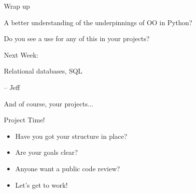\documentclass{beamer}
\begin{document}


\begin{frame}[fragile]{Wrap up}

\vfill
{\Large A better understanding of the underpinnings of OO in Python?}

\vfill
{\Large Do you see a use for any of this in your projects?}

\vfill

\end{frame}

\begin{frame}[fragile]{Next Week:}

\vfill
{\LARGE Relational databases, SQL}

\vfill
{\Large  -- Jeff}

\vfill
{\Large And of course, your projects...}

\vfill

\end{frame}

\begin{frame}[fragile]{Project Time!}

\begin{itemize}
    \item Have you got your structure in place? 
    \item Are your goals clear?
    \item Anyone want a public code review?
    \item Let's get to work!
\end{itemize}

\end{frame}
\end{document}
